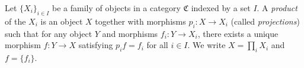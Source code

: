 Let $\{X_i\}_{i \in I}$ be a family of objects in a category $\mathfrak{C}$ indexed by a set $I$. A \textit{product} of the $X_i$ is an object $X$ together with morphisms $p_i : X \to X_i$ (called \textit{projections}) such that for any object $Y$ and morphisms $f_i : Y \to X_i$, there exists a unique morphism $f : Y \to X$ satisfying $p_i f = f_i$ for all $i \in I$. We write $X = \prod_i X_i$ and $f = \{f_i\}$.
